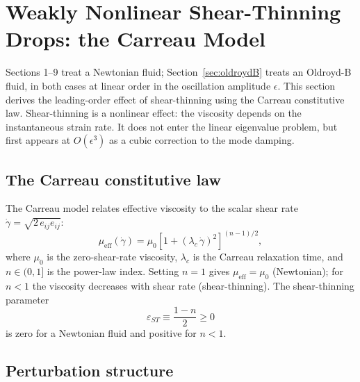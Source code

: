 \section{Weakly Nonlinear Shear-Thinning Drops: the Carreau Model}
\label{sec:carreau}

Sections 1--9 treat a Newtonian fluid; Section~\ref{sec:oldroydB} treats an
Oldroyd-B fluid, in both cases at linear order in the oscillation amplitude
$\epsilon$. This section derives the leading-order effect of shear-thinning
using the Carreau constitutive law. Shear-thinning is a nonlinear effect: the
viscosity depends on the instantaneous strain rate. It does not enter the
linear eigenvalue problem, but first appears at $O(\epsilon^3)$ as a cubic
correction to the mode damping.

\subsection{The Carreau constitutive law}

The Carreau model relates effective viscosity to the scalar shear rate
$\dot\gamma = \sqrt{2\,e_{ij}e_{ij}}$:
\begin{equation}
  \mu_{\mathrm{eff}}(\dot\gamma)
  = \mu_0 \left[1 + (\lambda_c\,\dot\gamma)^2\right]^{(n-1)/2},
  \label{eq:carreau}
\end{equation}
where $\mu_0$ is the zero-shear-rate viscosity, $\lambda_c$ is the Carreau
relaxation time, and $n \in (0,1]$ is the power-law index. Setting $n=1$
gives $\mu_{\mathrm{eff}} = \mu_0$ (Newtonian); for $n < 1$ the viscosity
decreases with shear rate (shear-thinning). The shear-thinning parameter
\begin{equation}
  \varepsilon_{ST} \equiv \frac{1-n}{2} \geq 0
  \label{eq:epsST}
\end{equation}
is zero for a Newtonian fluid and positive for $n < 1$.

\subsection{Perturbation structure}

